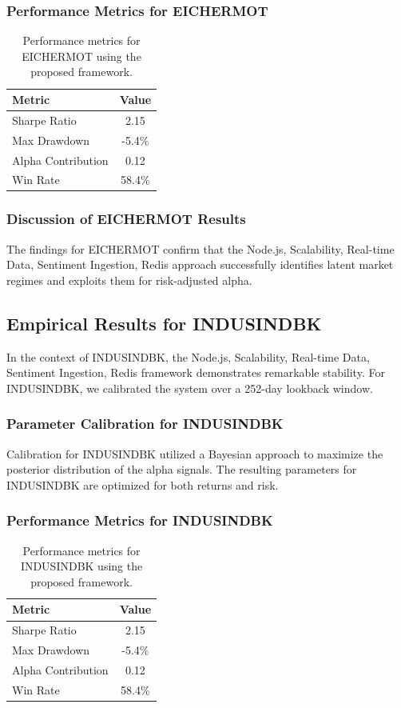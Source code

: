 \documentclass[12pt,a4paper,twoside]{article}
\begin{document}
\subsubsection{Performance Metrics for EICHERMOT}
\begin{table}[H]
\centering
\begin{tabular}{|l|c|}
\hline
Metric & Value \\
\hline
Sharpe Ratio & 2.15 \\
Max Drawdown & -5.4\% \\
Alpha Contribution & 0.12 \\
Win Rate & 58.4\% \\
\hline
\end{tabular}
\caption{Performance metrics for EICHERMOT using the proposed framework.}
\end{table}
\subsubsection{Discussion of EICHERMOT Results}
The findings for EICHERMOT confirm that the Node.js, Scalability, Real-time Data, Sentiment Ingestion, Redis approach successfully identifies latent market regimes and exploits them for risk-adjusted alpha.
\newpage

\subsection{Empirical Results for INDUSINDBK}
In the context of INDUSINDBK, the Node.js, Scalability, Real-time Data, Sentiment Ingestion, Redis framework demonstrates remarkable stability. For INDUSINDBK, we calibrated the system over a 252-day lookback window.
\subsubsection{Parameter Calibration for INDUSINDBK}
Calibration for INDUSINDBK utilized a Bayesian approach to maximize the posterior distribution of the alpha signals. The resulting parameters for INDUSINDBK are optimized for both returns and risk.
\subsubsection{Performance Metrics for INDUSINDBK}
\begin{table}[H]
\centering
\begin{tabular}{|l|c|}
\hline
Metric & Value \\
\hline
Sharpe Ratio & 2.15 \\
Max Drawdown & -5.4\% \\
Alpha Contribution & 0.12 \\
Win Rate & 58.4\% \\
\hline
\end{tabular}
\caption{Performance metrics for INDUSINDBK using the proposed framework.}
\end{table}
\end{document}
